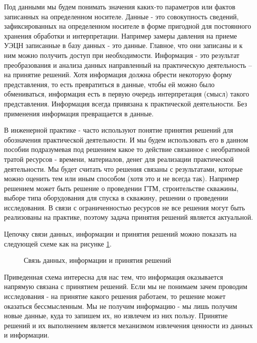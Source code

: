 Под данными мы будем понимать значения каких-то параметров или фактов записанных на определенном носителе. Данные - это совокупность сведений, зафиксированных на определенном носителе в форме пригодной для постоянного хранения обработки и интерпретации. Например замеры давления на приеме УЭЦН записанные в базу данных - это данные. Главное, что они записаны и к ним можно получить доступ при необходимости. 
Информация - это результат преобразования и анализа данных направленный на практическую деятельность -- на принятие решений. Хотя информация должна обрести некоторую форму представления, то есть превратиться в данные, чтобы ей можно было обмениваться, информация есть в первую очередь интерпретация (смысл) такого представления. Информация всегда привязана к практической деятельности. Без применения информация превращается в данные. 

В инженерной практике - часто используют понятие принятия решений для обозначения практической деятельности. И мы будем использовать его в данном пособии подразумевая под решением какое то действие связанное с необратимой тратой ресурсов - времени, материалов, денег для реализации практической деятельности. Мы будет считать что решения связаны с результатами, которые можно оценить тем или иным способом (хотя это и не всегда так). Например решением может быть решение о проведении ГТМ, строительстве скважины, выборе типа оборудования для спуска в скважину, решении о проведении исследования. В связи с ограниченностью ресурсов не все решения могут быть реализованы на практике, поэтому задача принятия решений является актуальной.


Цепочку связи данных, информации и принятия решений можно показать на следующей схеме как на рисунке \ref{ris:data_info_decision_chart_1}. 

\begin{figure}[h!]
	\begin{center}
		
		\caption{Связь данных, информации и принятия решений}
		\label{ris:data_info_decision_chart_1}
	\end{center}
\end{figure}

Приведенная схема интересна для нас тем, что информация оказывается напрямую связана с принятием решений. Если мы не понимаем зачем проводим исследования - на принятие какого решения работаем, то решение может оказаться бессмысленным. Мы не получим информацию - мы лишь получим новые данные, куда то запишем их, но извлечем из них пользу. Принятие решений и их выполнением является механизмом извлечения ценности из данных и информации.

